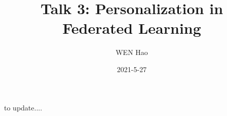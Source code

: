 

\title{Talk 3: Personalization in Federated Learning}
\date{2021-5-27}
\author{WEN Hao}

\maketitle

to update....





